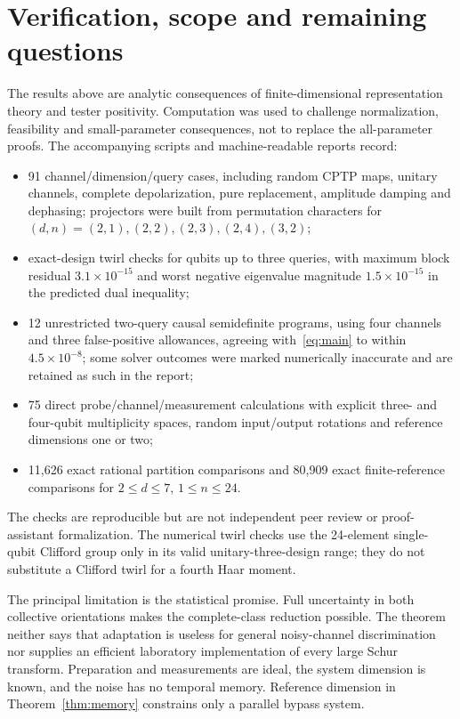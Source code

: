 \documentclass[11pt,a4paper]{article}
\theoremstyle{remark}\newtheorem{remark}[theorem]{Remark}
\begin{document}
\section{Verification, scope and remaining questions}
The results above are analytic consequences of finite-dimensional representation theory and tester positivity. Computation was used to challenge normalization, feasibility and small-parameter consequences, not to replace the all-parameter proofs. The accompanying scripts and machine-readable reports record:
\begin{itemize}
 \item 91 channel/dimension/query cases, including random CPTP maps, unitary channels, complete depolarization, pure replacement, amplitude damping and dephasing; projectors were built from permutation characters for $(d,n)=(2,1),(2,2),(2,3),(2,4),(3,2)$;
 \item exact-design twirl checks for qubits up to three queries, with maximum block residual $3.1\times10^{-15}$ and worst negative eigenvalue magnitude $1.5\times10^{-15}$ in the predicted dual inequality;
 \item 12 unrestricted two-query causal semidefinite programs, using four channels and three false-positive allowances, agreeing with~\eqref{eq:main} to within $4.5\times10^{-8}$; some solver outcomes were marked numerically inaccurate and are retained as such in the report;
 \item 75 direct probe/channel/measurement calculations with explicit three- and four-qubit multiplicity spaces, random input/output rotations and reference dimensions one or two;
 \item 11,626 exact rational partition comparisons and 80,909 exact finite-reference comparisons for $2\leq d\leq7$, $1\leq n\leq24$.
\end{itemize}
The checks are reproducible but are not independent peer review or proof-assistant formalization. The numerical twirl checks use the 24-element single-qubit Clifford group only in its valid unitary-three-design range; they do not substitute a Clifford twirl for a fourth Haar moment.

The principal limitation is the statistical promise. Full uncertainty in both collective orientations makes the complete-class reduction possible. The theorem neither says that adaptation is useless for general noisy-channel discrimination nor supplies an efficient laboratory implementation of every large Schur transform. Preparation and measurements are ideal, the system dimension is known, and the noise has no temporal memory. Reference dimension in Theorem~\ref{thm:memory} constrains only a parallel bypass system.
\end{document}
